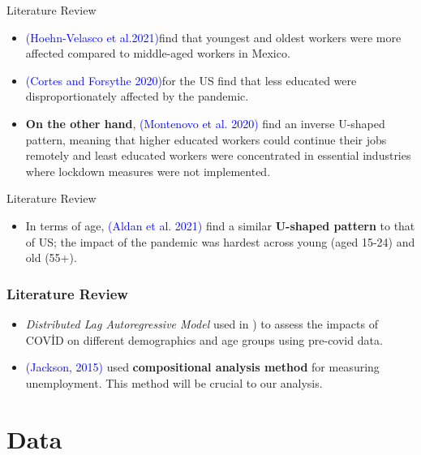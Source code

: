 \documentclass[
	11pt, %
]{beamer}
\begin{document}
\begin{frame}{Literature Review}
    \begin{itemize}
        \item \textcolor{blue}{(Hoehn-Velasco et al.2021)}find that youngest and oldest workers were more affected compared to middle-aged workers in Mexico. 
        \item \textcolor{blue}{(Cortes and Forsythe 2020)}for the US find that less educated were disproportionately affected by the pandemic.
        \item \textbf{On the other hand}, \textcolor{blue}{(Montenovo et al. 2020)} find an inverse U-shaped pattern, meaning that higher educated workers could continue their jobs remotely and least educated workers were concentrated in essential industries where lockdown measures were not implemented.
    \end{itemize} 

 
\end{frame}


\begin{frame}{Literature Review}
\begin{itemize}
    \item In terms of age, \textcolor{blue}{(Aldan et al. 2021)} find a similar \textbf{U-shaped pattern} to that of US; the impact of the pandemic was hardest across young (aged 15-24) and old (55+). 
\end{itemize}
 
    
\end{frame}

\begin{frame}

    \frametitle{Literature Review}
    \begin{itemize}
        \item \textit{Distributed Lag Autoregressive Model} used in \textcolor{(ILO, 2021}){} to assess the impacts of COVİD on different demographics and age groups using pre-covid data.
        \item \textcolor{blue}{(Jackson, 2015)} used \textbf{compositional analysis method} for measuring unemployment. This method will be crucial to our analysis.
    \end{itemize}
    
    
    
\end{frame}

\section{Data}
\end{document}
